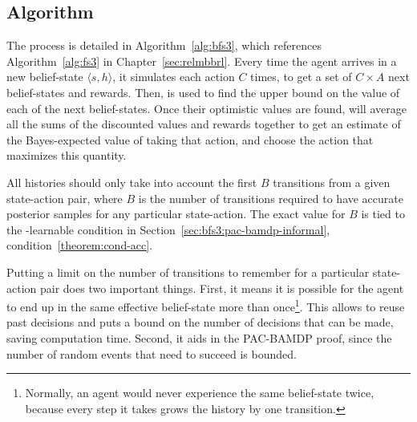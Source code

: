 \subsection{Algorithm}

The  process is detailed in Algorithm~\ref{alg:bfs3}, which references Algorithm~\ref{alg:fs3} in Chapter~\ref{sec:relmbbrl}. Every time the agent arrives in a new belief-state $\langle s, h\rangle$, it simulates each action $C$ times, to get a set of $C \times A$ next belief-states and rewards. Then,  is used to find the upper bound on the value of each of the next belief-states. Once their optimistic values are found,  will average all the sums of the discounted values and rewards together to get an estimate of the Bayes-expected value of taking that action, and choose the action that maximizes this quantity.

All histories should only take into account the first $B$ transitions from a given state-action pair, where $B$ is the number of transitions required to have accurate posterior samples for any particular state-action. The exact value for $B$ is tied to the \bed-learnable condition in Section~\ref{sec:bfs3:pac-bamdp-informal}, condition~\ref{theorem:cond-acc}.

Putting a limit on the number of transitions to remember for a particular state-action pair does two important things. First, it means it is possible for the agent to end up in the same effective belief-state more than once\footnote{Normally, an agent would never experience the same belief-state twice, because every step it takes grows the history by one transition.}. This allows  to reuse past decisions and puts a bound on the number of decisions that can be made, saving computation time. Second, it aids in the PAC-BAMDP proof, since the number of random events that need to succeed is bounded.

